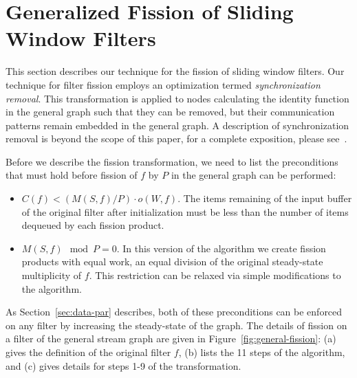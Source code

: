 \section{Generalized Fission of Sliding Window Filters}

This section describes our technique for the fission of sliding window
filters. Our technique for filter fission employs an optimization
termed {\it synchronization removal}.  This transformation is applied
to nodes calculating the identity function in the general graph such
that they can be removed, but their communication patterns remain
embedded in the general graph. A description of synchronization
removal is beyond the scope of this paper, for a complete exposition,
please see~\cite{mgordon-phd}.

Before we describe the fission transformation, we need to list the
preconditions that must hold before fission of $f$ by $P$ in the general
graph can be performed:
\begin{itemize}
\item $C(f) < (M(S,f) / P) \cdot o(W, f)$. The items remaining of
  the input buffer of the original filter after initialization must be
  less than the number of items dequeued by each fission product.

\item $M(S,f) \mod P = 0$. In this version of the algorithm we create
  fission products with equal work, an equal division of the original
  steady-state multiplicity of $f$.  This restriction can be relaxed
  via simple modifications to the algorithm.
\end{itemize}
\noindent As Section~\ref{sec:data-par} describes, both of these
preconditions can be enforced on any filter by increasing the
steady-state of the graph. The details of fission on a filter of the
general stream graph are given in Figure~\ref{fig:general-fission}:
(a) gives the definition of the original filter $f$, (b) lists the 11
steps of the algorithm, and (c) gives details for steps 1-9 of the
transformation.

